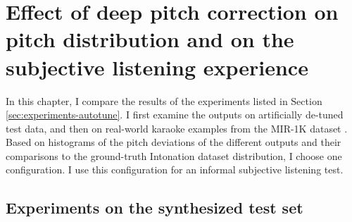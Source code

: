\chapter{Effect of deep pitch correction on pitch distribution and on the subjective listening experience}
\label{chap:results}
In this chapter, I compare the results of the experiments listed in Section \ref{sec:experiments-autotune}. I first examine the outputs on artificially de-tuned test data, and then on real-world karaoke examples from the MIR-1K dataset \cite{hsu2009improvement}. Based on histograms of the pitch deviations of the different outputs and their comparisons to the ground-truth Intonation dataset distribution, I choose one configuration. I use this configuration for an informal subjective listening test.

\section{Experiments on the synthesized test set}


